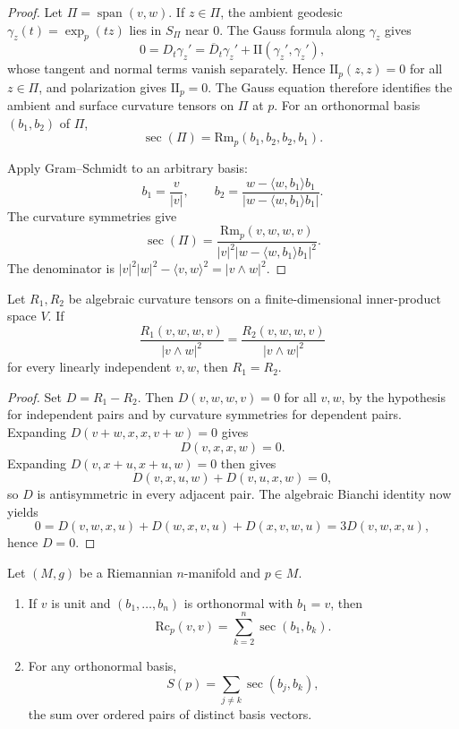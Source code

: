 \begin{proof}
\sketch
Let $\Pi=\operatorname{span}(v,w)$.  If $z\in\Pi$, the ambient geodesic
$\gamma_z(t)=\exp_p(tz)$ lies in $S_\Pi$ near $0$.  The Gauss formula along
$\gamma_z$ gives
\[
0=D_t\gamma_z'=\overline D_t\gamma_z'+\mathrm{II}(\gamma_z',\gamma_z'),
\]
whose tangent and normal terms vanish separately.  Hence
$\mathrm{II}_p(z,z)=0$ for all $z\in\Pi$, and polarization gives
$\mathrm{II}_p=0$.  The Gauss equation therefore identifies the ambient and
surface curvature tensors on $\Pi$ at $p$.  For an orthonormal basis
$(b_1,b_2)$ of $\Pi$,
\[
\sec(\Pi)=\mathrm{Rm}_p(b_1,b_2,b_2,b_1).
\]

Apply Gram--Schmidt to an arbitrary basis:
\[
b_1=\frac v{|v|},
\qquad
b_2=\frac{w-\langle w,b_1\rangle b_1}
{|w-\langle w,b_1\rangle b_1|}.
\]
The curvature symmetries give
\begin{equation}
\sec(\Pi)=
\frac{\mathrm{Rm}_p(v,w,w,v)}
{|v|^2|w-\langle w,b_1\rangle b_1|^2}. \tag{8.29}
\end{equation}
The denominator is
$|v|^2|w|^2-\langle v,w\rangle^2=|v\wedge w|^2$.
\end{proof}

\begin{proposition}
\label{prop:sectional-curvature-determines-curvature-tensor}
Let $R_1,R_2$ be algebraic curvature tensors on a finite-dimensional
inner-product space $V$.  If
\[
\frac{R_1(v,w,w,v)}{|v\wedge w|^2}
=\frac{R_2(v,w,w,v)}{|v\wedge w|^2}
\]
for every linearly independent $v,w$, then $R_1=R_2$.
\end{proposition}

\begin{proof}
\sketch
Set $D=R_1-R_2$.  Then $D(v,w,w,v)=0$ for all $v,w$, by the hypothesis for
independent pairs and by curvature symmetries for dependent pairs.  Expanding
$D(v+w,x,x,v+w)=0$ gives
\[
D(v,x,x,w)=0.
\]
Expanding $D(v,x+u,x+u,w)=0$ then gives
\[
D(v,x,u,w)+D(v,u,x,w)=0,
\]
so $D$ is antisymmetric in every adjacent pair.  The algebraic Bianchi
identity now yields
\[
0=D(v,w,x,u)+D(w,x,v,u)+D(x,v,w,u)=3D(v,w,x,u),
\]
hence $D=0$.
\end{proof}

\begin{proposition}
\label{prop:geometric-interpretation-ricci-scalar-curvatures}
Let $(M,g)$ be a Riemannian $n$-manifold and $p\in M$.
\begin{enumerate}
\item[(a)] If $v$ is unit and $(b_1,\ldots,b_n)$ is orthonormal with $b_1=v$,
then
\[
\mathrm{Rc}_p(v,v)=\sum_{k=2}^n\sec(b_1,b_k).
\]
\item[(b)] For any orthonormal basis,
\[
S(p)=\sum_{j\ne k}\sec(b_j,b_k),
\]
the sum over ordered pairs of distinct basis vectors.
\end{enumerate}
\end{proposition}

